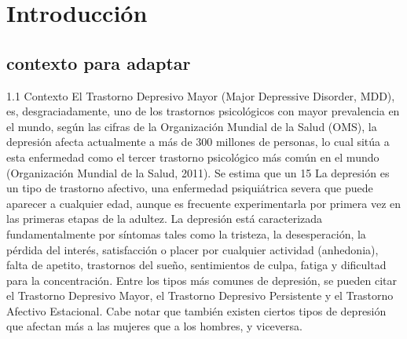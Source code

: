 \chapter{Introducción}
\label{chapter:introduccion}


\section{contexto para adaptar}

1.1 Contexto
El Trastorno Depresivo Mayor (Major Depressive Disorder, MDD), es, desgraciadamente, uno de los trastornos psicológicos con mayor prevalencia en el mundo, según las cifras de la Organización Mundial de la Salud (OMS), la depresión afecta actualmente a más de 300 millones de personas, lo cual sitúa a esta enfermedad como el tercer trastorno psicológico más común en el mundo (Organización Mundial de la Salud, 2011).
Se estima que un 15%
La depresión es un tipo de trastorno afectivo, una enfermedad psiquiátrica severa que puede aparecer a cualquier edad, aunque es frecuente experimentarla por primera vez en las primeras etapas de la adultez. La depresión está caracterizada fundamentalmente por síntomas tales como la tristeza, la desesperación, la pérdida del interés, satisfacción o placer por cualquier actividad (anhedonia), falta de apetito, trastornos del sueño, sentimientos de culpa, fatiga y dificultad para la concentración.
Entre los tipos más comunes de depresión, se pueden citar el Trastorno Depresivo Mayor, el Trastorno Depresivo Persistente y el Trastorno Afectivo Estacional. Cabe notar que también existen ciertos tipos de depresión que afectan más a las mujeres que a los hombres, y viceversa.
